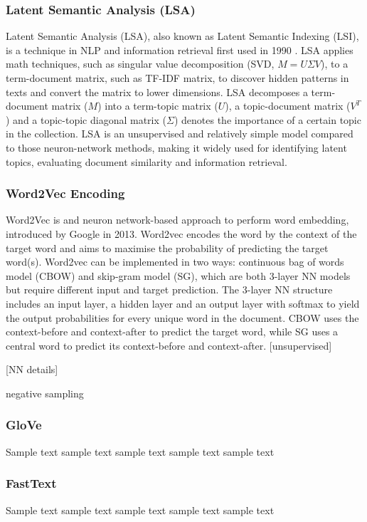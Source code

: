 \subsubsection{Latent Semantic Analysis (LSA)}
Latent Semantic Analysis (LSA), also known as Latent Semantic Indexing (LSI), is a technique in NLP and information retrieval first used in 1990 \cite{deerwester1990}.
LSA applies math techniques, such as singular value decomposition (SVD, $M=U \Sigma V$), to a term-document matrix, such as TF-IDF matrix, to discover hidden patterns in texts and convert the matrix to lower dimensions.
LSA decomposes a term-document matrix ($M$) into a term-topic matrix ($U$), a topic-document matrix ($V^T$) and a topic-topic diagonal matrix ($\Sigma$) denotes the importance of a certain topic in the collection.
LSA is an unsupervised and relatively simple model compared to those neuron-network methods, making it widely used for identifying latent topics, evaluating document similarity and information retrieval.

\subsubsection{Word2Vec Encoding}
Word2Vec is and neuron network-based approach to perform word embedding, introduced by Google in 2013\cite{mikolov2013efficient}\cite{mikolov2013distributed}.
Word2vec encodes the word by the context of the target word and aims to maximise the probability of predicting the target word(s).
Word2vec can be implemented in two ways: continuous bag of words model (CBOW) and skip-gram model (SG), which are both 3-layer NN models but require different input and target prediction.
The 3-layer NN structure includes an input layer, a hidden layer and an output layer with softmax to yield the output probabilities for every unique word in the document.
CBOW uses the context-before and context-after to predict the target word, while SG uses a central word to predict its context-before and context-after.
[unsupervised]

[NN details]

\cite{mnih2012} \cite{gutmann2012} negative sampling 

\subsubsection{GloVe}
Sample text sample text sample text sample text sample text

\subsubsection{FastText}
Sample text sample text sample text sample text sample text

